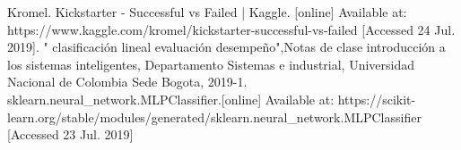\documentclass[journal]{IEEEtran}
\begin{document}
%
%
%
\begin{thebibliography}{1}

Kromel. Kickstarter - Successful vs Failed | Kaggle. [online] Available at: https://www.kaggle.com/kromel/kickstarter-successful-vs-failed [Accessed 24 Jul. 2019].
" clasificación lineal evaluación desempeño",Notas de clase introducción a los sistemas inteligentes, Departamento Sistemas e industrial, Universidad Nacional de Colombia Sede Bogota, 2019-1.
sklearn.neural\_network.MLPClassifier.[online] Available at: https://scikit-learn.org/stable/modules/generated/sklearn.neural\_network.MLPClassifier   [Accessed 23 Jul. 2019]
\end{thebibliography}

% 










\end{document}
